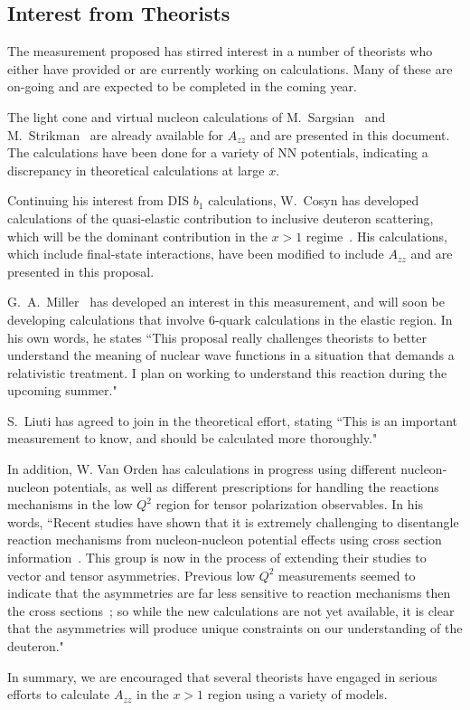 \subsection{Interest from Theorists}

The measurement proposed has stirred interest in a number of theorists who either have provided or are currently working on calculations. Many of these are on-going and are expected to be completed in the coming year.

The light cone and virtual nucleon calculations of M.~Sargsian~\cite{misak-convo} and M.~Strikman~\cite{strikman-convo} are already available for $A_{zz}$ and are presented in this document. The calculations have been done for a variety of NN potentials, indicating a discrepancy in theoretical calculations at large $x$. 

Continuing his interest from DIS $b_1$ calculations, W.~Cosyn has developed calculations of the quasi-elastic contribution to inclusive deuteron scattering, which will be the dominant contribution in the $x>1$ regime~\cite{cosyn-convo}. His calculations, which include final-state interactions, have been modified to include $A_{zz}$ and are presented in this proposal.

G.~A.~Miller~\cite{miller-convo} has developed an interest in this measurement, and will soon be developing calculations that involve 6-quark calculations in the elastic region. In his own words, he states ``This proposal really challenges theorists to better understand the meaning of nuclear wave functions in a situation that demands a relativistic treatment. I plan on working to understand this reaction during the upcoming summer."

S.~Liuti has agreed to join in the theoretical effort, stating ``This is an important measurement to know, and should be calculated more thoroughly."~\cite{liuti-convo}

In addition, W. Van Orden has calculations in progress using different nucleon-nucleon potentials, as well as different prescriptions for handling the reactions mechanisms in the low $Q^2$ region for tensor polarization observables. In his words, ``Recent studies have shown that it is extremely challenging to disentangle reaction mechanisms from nucleon-nucleon potential effects using cross section information~\cite{Ford:2014yua}. This group is now in the process of extending their studies to vector and tensor asymmetries. Previous low $Q^2$ measurements seemed to indicate that the asymmetries are far less sensitive to reaction 
mechanisms then the cross sections~\cite{Passchier:2001uc}; so while the 
new calculations are not yet available, it is clear that the asymmetries will produce unique constraints 
on our understanding of the deuteron."~\cite{vanorden-convo}




In summary, we are encouraged that several theorists have engaged in serious efforts to calculate $A_{zz}$ in the $x>1$ region using a variety of models.